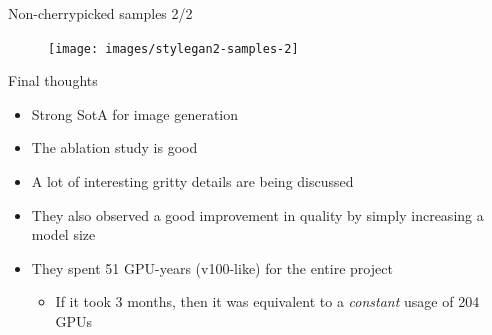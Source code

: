 \documentclass[handout, 10pt]{beamer}
\begin{document}
\begin{frame}{Non-cherrypicked samples 2/2}
\begin{figure}
\centering
\texttt{[image: images/stylegan2-samples-2]}
\end{figure}
\end{frame}


\begin{frame}{Final thoughts}
\begin{itemize}
    \item\pause Strong SotA for image generation
    \item\pause The ablation study is good
    \item\pause A lot of interesting gritty details are being discussed
    \item\pause They also observed a good improvement in quality by simply increasing a model size
    \item\pause They spent 51 GPU-years (v100-like) for the entire project
    \begin{itemize}
        \item\pause If it took 3 months, then it was equivalent to a \textit{constant} usage of 204 GPUs
    \end{itemize}
\end{itemize}
\end{frame}
\end{document}
